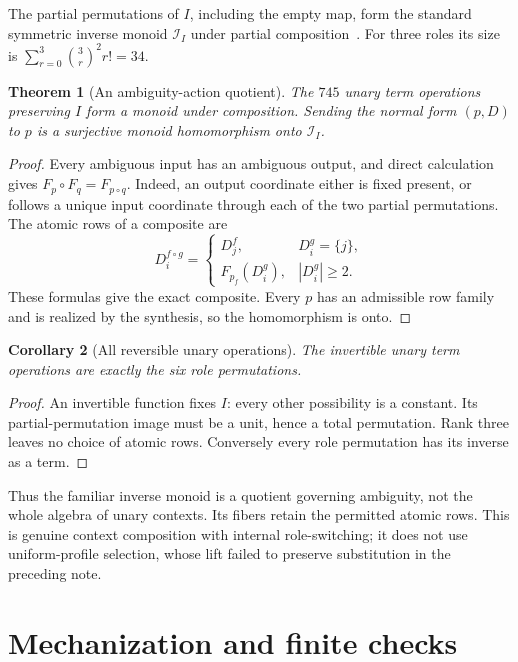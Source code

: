 \documentclass[11pt]{article}
\newtheorem{theorem}{Theorem}[section]
\newtheorem{corollary}[theorem]{Corollary}
\begin{document}
The partial permutations of $I$, including the empty map, form the
standard symmetric inverse monoid $\mathcal I_I$ under partial
composition~\cite{East2006}. For three roles its size is
$\sum_{r=0}^3\binom3r^2r!=34$.

\begin{theorem}[An ambiguity-action quotient]\label{thm:monoid}
The $745$ unary term operations preserving $I$ form a monoid under
composition. Sending the normal form $(p,D)$ to $p$ is a surjective
monoid homomorphism onto $\mathcal I_I$.
\end{theorem}
\begin{proof}
Every ambiguous input has an ambiguous output, and direct calculation
gives $F_p\circ F_q=F_{p\circ q}$. Indeed, an output coordinate either
is fixed present, or follows a unique input coordinate through each of
the two partial permutations. The atomic rows of a composite are
\[
 D^{f\circ g}_i=\begin{cases}
 D^f_j,&D^g_i=\{j\},\\
 F_{p_f}(D^g_i),&|D^g_i|\geq2.
 \end{cases}
\]
These formulas give the exact composite. Every $p$ has an admissible row
family and is realized by the synthesis, so the homomorphism is onto.
\end{proof}

\begin{corollary}[All reversible unary operations]
The invertible unary term operations are exactly the six role
permutations.
\end{corollary}
\begin{proof}
An invertible function fixes $I$: every other possibility is a constant.
Its partial-permutation image must be a unit, hence a total permutation.
Rank three leaves no choice of atomic rows. Conversely every role
permutation has its inverse as a term.
\end{proof}

Thus the familiar inverse monoid is a quotient governing ambiguity,
not the whole algebra of unary contexts. Its fibers retain the permitted
atomic rows. This is genuine context composition with internal
role-switching; it does not use uniform-profile selection, whose lift
failed to preserve substitution in the preceding note.

\section{Mechanization and finite checks}
\end{document}
